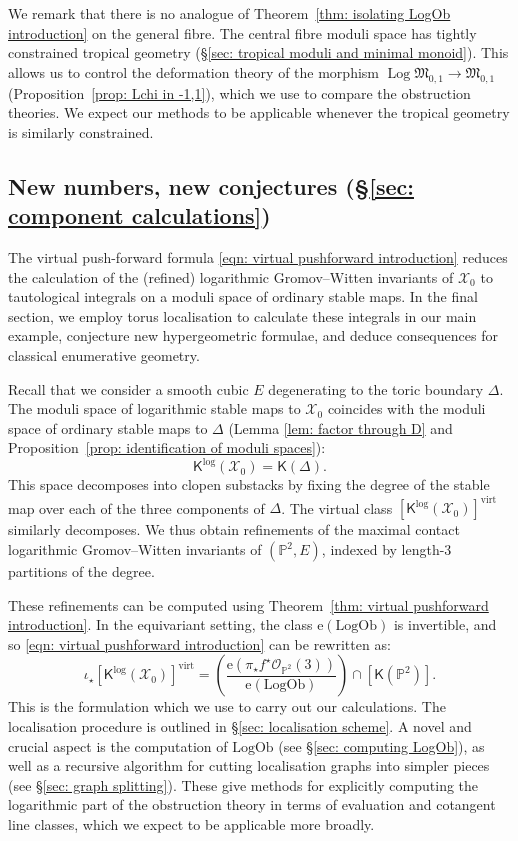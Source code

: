 \documentclass[11pt]{amsart}
\theoremstyle{definition}
\theoremstyle{definition}
\newcommand{\op}[1]{\operatorname{#1}}
\newcommand{\e}{\mathrm{e}}
\newcommand{\PP}{\mathbb{P}}
\newcommand{\OO}{\mathcal{O}}
\newcommand{\virt}{\op{virt}}
\newcommand{\LogOb}{\mathrm{LogOb}}
\newcommand{\Xcal}{\mathcal{X}}
\newcommand{\Mfrak}{\mathfrak{M}}
\newcommand{\Kup}{\mathsf{K}}
\newcommand{\Log}{\operatorname{Log}}
\begin{document}
 We remark that there is no analogue of Theorem~\ref{thm: isolating LogOb introduction} on the general fibre. The central fibre moduli space has tightly constrained tropical geometry (\S \ref{sec: tropical moduli and minimal monoid}). This allows us to control the deformation theory of the morphism $\Log \Mfrak_{0,1} \to \Mfrak_{0,1}$ (Proposition~\ref{prop: Lchi in -1,1}), which we use to compare the obstruction theories. We expect our methods to be applicable whenever the tropical geometry is similarly constrained.

\subsection{New numbers, new conjectures (\S \ref{sec: component calculations})} \label{sec: contribution 3}\label{sec: new numbers introduction} The virtual push-forward formula \eqref{eqn: virtual pushforward introduction} reduces the calculation of the (refined) logarithmic Gromov--Witten invariants of $\Xcal_0$ to tautological integrals on a moduli space of ordinary stable maps. In the final section, we employ torus localisation to calculate these integrals in our main example, conjecture new hypergeometric formulae, and deduce consequences for classical enumerative geometry.

Recall that we consider a smooth cubic $E$ degenerating to the toric boundary $\Delta$. The moduli space of logarithmic stable maps to $\Xcal_0$ coincides with the moduli space of ordinary stable maps to $\Delta$ (Lemma \ref{lem: factor through D} and Proposition~\ref{prop: identification of moduli spaces}):
\begin{equation*} \Kup^{\log}(\Xcal_0) = \Kup(\Delta).\end{equation*}
This space decomposes into clopen substacks by fixing the degree of the stable map over each of the three components of $\Delta$. The virtual class $[\Kup^{\log}(\Xcal_0)]^{\virt}$ similarly decomposes. We thus obtain refinements of the maximal contact logarithmic Gromov--Witten invariants of $(\PP^2,E)$, indexed by length-$3$ partitions of the degree.

These refinements can be computed using Theorem~\ref{thm: virtual pushforward introduction}. In the equivariant setting, the class $\e(\LogOb)$ is invertible, and so \eqref{eqn: virtual pushforward introduction} can be rewritten as:
\begin{equation*} \iota_\star [\Kup^{\log}(\Xcal_0)]^{\virt} = \left( \dfrac{\e(\pi_\star f^\star \OO_{\PP^2}(3))}{\e(\LogOb)}\right) \cap [\Kup(\PP^2)].\end{equation*}
This is the formulation which we use to carry out our calculations. The localisation procedure is outlined in \S \ref{sec: localisation scheme}. A novel and crucial aspect is the computation of $\LogOb$ (see \S \ref{sec: computing LogOb}), as well as a recursive algorithm for cutting localisation graphs into simpler pieces (see \S \ref{sec: graph splitting}). These give methods for explicitly computing the logarithmic part of the obstruction theory in terms of evaluation and cotangent line classes, which we expect to be applicable more broadly.
\end{document}
